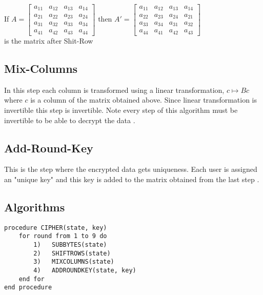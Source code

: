 \vspace{3mm}
If \(A=\begin{bmatrix}
    a_{11}&a_{12}&a_{13}&a_{14}\\
    a_{21}&a_{22}&a_{23}&a_{24}\\
    a_{31}&a_{32}&a_{33}&a_{34}\\
    a_{41}&a_{42}&a_{43}&a_{44}
    \end{bmatrix}\) \hspace{3mm} then \(A'=\begin{bmatrix}
    a_{11}&a_{12}&a_{13}&a_{14}\\
    a_{22}&a_{23}&a_{24}&a_{21}\\
    a_{33}&a_{34}&a_{31}&a_{32}\\
    a_{44}&a_{41}&a_{42}&a_{43}
    \end{bmatrix}\) \vspace{2mm} \\[3mm] is the matrix after Shit-Row

\subsection{Mix-Columns}
In this step each column is transformed using a linear transformation, \(c \mapsto Bc\) where \(c\) is a column of the matrix obtained above. Since linear transformation is invertible this step is invertible. Note every step of this algorithm must be invertible to be able to decrypt the data \cite{aes}.

\subsection{Add-Round-Key}
This is the step where the encrypted data gets uniqueness. Each user is assigned an "unique key" and this key is added to the matrix obtained from the last step \cite{aes}.

\subsection{Algorithms}
\begin{tcolorbox}[colback=gray!20, colframe=blue!30, left=2cm, title={\small \bfseries \textcolor{black}{Encryption Algorithm}}, width=15cm]
\begin{verbatim}
procedure CIPHER(state, key)
    for round from 1 to 9 do
        1)   SUBBYTES(state)
        2)   SHIFTROWS(state)
        3)   MIXCOLUMNS(state)
        4)   ADDROUNDKEY(state, key)
    end for
end procedure
\end{verbatim} \cite{aes}
\end{tcolorbox}

